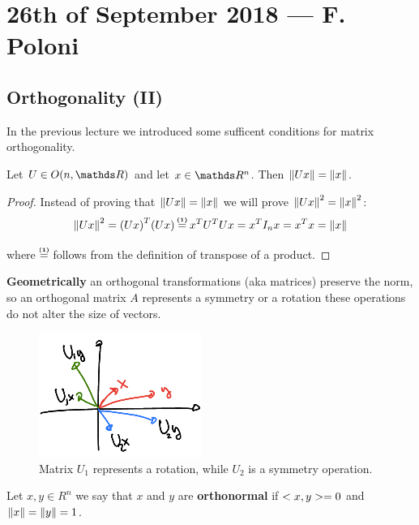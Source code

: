 \documentclass[ComputationalMathematics.tex]{subfiles}
\begin{document}
\section{26th of September 2018 --- F. Poloni}

\subsection{Orthogonality (II)}
In the previous lecture we introduced some sufficent conditions for matrix orthogonality.

\begin{theorem}
  Let $U \in O(n, \R)$ and let $x \in \R^n$. Then $\left\lVert Ux\right\rVert = \left\lVert x\right\rVert$.
\end{theorem}

\begin{proof}
  Instead of proving that $\left\lVert Ux\right\rVert = \left\lVert x\right\rVert$ we will prove $\left\lVert Ux\right\rVert^2 = \left\lVert x\right\rVert^2$:\\
  
  \[
    \norm{Ux}^2 = \tr{(Ux)} (Ux) \numeq{(1)} \tr{x} \tr{U} U x = \tr{x} I_n x = \tr{x} x = \norm{x}
  \]

  where $\numeq{(1)}$ follows from the definition of transpose of a product.
\end{proof}

\textbf{Geometrically} an orthogonal transformations (aka matrices) preserve the norm, so an orthogonal matrix $A$ represents a symmetry or a rotation these operations do not alter the size of vectors.

\begin{figure}[H]
    \centering
    \includegraphics[scale = 2]{pics/26sett/orthgonal.png}
    \caption{Matrix $U_1$ represents a rotation, while $U_2$ is a symmetry operation.}\label{fig:26sett_ortho}
\end{figure}

\begin{definition}[Orthonormality]
  Let $x, y \in R^n$ we say that $x$ and $y$ are \textbf{orthonormal} if $<x, y> = 0$ and $\left\lVert x\right\rVert = \left\lVert y\right\rVert = 1$.
\end{definition}
\end{document}
